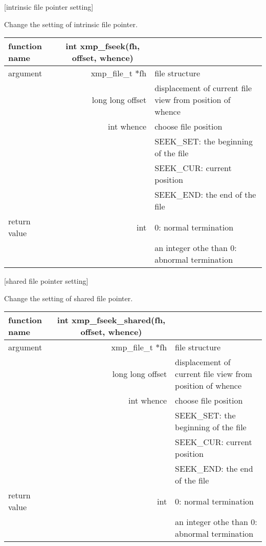    [intrinsic file pointer setting]

   Change the setting of intrinsic file pointer.
   \begin{table}[h]
    \begin{center}
     \begin{tabular}{l|r|p{70mm}}
      \hline
      {\bf function name}  & \multicolumn{1}{c}{\bf int xmp\_fseek(fh,
      offset, whence)} &  \\ \hline
      argument & xmp\_file\_t $*$fh & file structure \\ \cline{2-3}
      & long long offset & displacement of current file view from
	      position of whence \\ \cline{2-3}
      & int whence & choose file position \\
      &  & SEEK\_SET: the beginning of the file \\ 
      &  & SEEK\_CUR: current position \\ 
      &  & SEEK\_END: the end of the file \\ \hline
      return value & int & 0: normal termination \\
      &  & an integer othe than 0: abnormal termination \\ \hline
      \end{tabular}
     \end{center}
    \label{tb:aaa}
   \end{table}

   \clearpage

   [shared file pointer setting]

   Change the setting of shared file pointer.
   \begin{table}[h]
    \begin{center}
     \begin{tabular}{l|r|p{70mm}}
      \hline
      {\bf function name}  & \multicolumn{1}{c}{\bf int xmp\_fseek\_shared(fh,
      offset, whence)} &  \\ \hline
      argument & xmp\_file\_t $*$fh & file structure \\ \cline{2-3}
      & long long offset & displacement of current file view from
	      position of whence \\ \cline{2-3}
      & int whence & choose file position \\
      &  & SEEK\_SET: the beginning of the file \\ 
      &  & SEEK\_CUR: current position \\ 
      &  & SEEK\_END: the end of the file \\ \hline
      return value & int & 0: normal termination \\
      &  & an integer othe than 0: abnormal termination \\ \hline
      \end{tabular}
     \end{center}
    \label{tb:aaa}
   \end{table}


